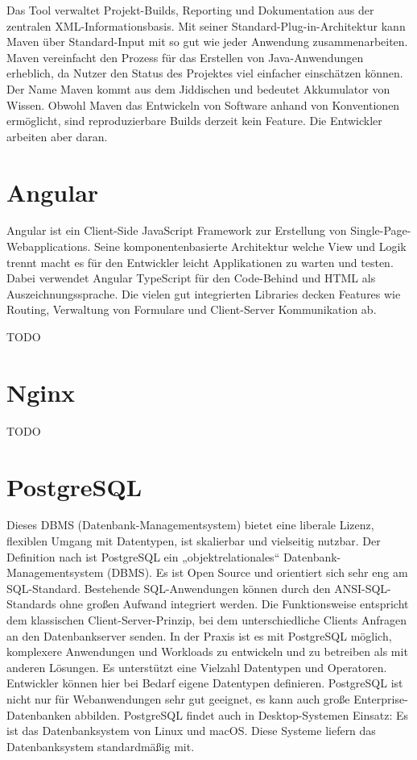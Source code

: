 Das Tool verwaltet Projekt-Builds, Reporting und Dokumentation aus der zentralen XML-Informationsbasis. 
Mit seiner Standard-Plug-in-Architektur kann Maven über Standard-Input mit so gut wie jeder Anwendung zusammenarbeiten.
Maven vereinfacht den Prozess für das Erstellen von Java-Anwendungen erheblich, da Nutzer den Status des Projektes viel einfacher einschätzen können.
Der Name Maven kommt aus dem Jiddischen und bedeutet Akkumulator von Wissen. Obwohl Maven das Entwickeln von Software anhand von Konventionen ermöglicht, 
sind reproduzierbare Builds derzeit kein Feature. Die Entwickler arbeiten aber daran. 
\cite{sysarch-maven-1}

\section{Angular}

Angular ist ein Client-Side JavaScript Framework zur Erstellung von Single-Page-Webapplications. 
Seine komponentenbasierte Architektur welche View und Logik trennt macht es für den Entwickler leicht 
Applikationen zu warten und testen. Dabei verwendet Angular TypeScript für den Code-Behind und HTML als Auszeichnungssprache. 
Die vielen gut integrierten Libraries decken Features wie Routing, Verwaltung von Formulare und Client-Server Kommunikation ab. 

TODO

\section{Nginx}

TODO

\section{PostgreSQL}

Dieses DBMS (Datenbank-Managementsystem) bietet eine liberale Lizenz, flexiblen Umgang mit Datentypen, ist skalierbar und vielseitig nutzbar.
Der Definition nach ist PostgreSQL ein „objektrelationales“ Datenbank-Managementsystem (DBMS). Es ist Open Source und orientiert sich sehr eng am SQL-Standard. Bestehende SQL-Anwendungen 
können durch den ANSI-SQL-Standards ohne großen Aufwand integriert werden. Die Funktionsweise entspricht dem klassischen Client-Server-Prinzip, bei dem unterschiedliche Clients Anfragen an den Datenbankserver senden.
In der Praxis ist es mit PostgreSQL möglich, komplexere Anwendungen und Workloads zu entwickeln und zu betreiben als mit anderen Lösungen. 
Es unterstützt eine Vielzahl Datentypen und Operatoren. Entwickler können hier bei Bedarf eigene Datentypen definieren. PostgreSQL ist nicht nur für Webanwendungen sehr gut geeignet, es kann auch große Enterprise-Datenbanken abbilden. 
PostgreSQL findet auch in Desktop-Systemen Einsatz: Es ist das Datenbanksystem von Linux und macOS. Diese Systeme liefern das Datenbanksystem standardmäßig mit.
\cite{sysarch-postgresql-1}

